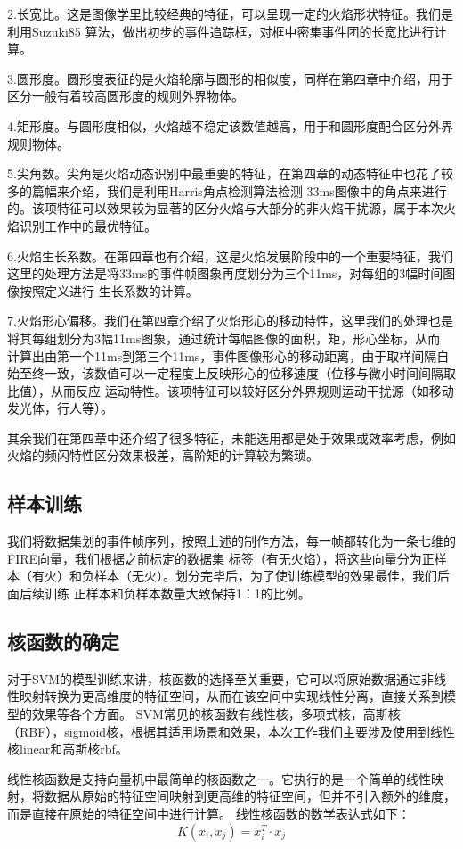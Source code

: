 2.长宽比。这是图像学里比较经典的特征，可以呈现一定的火焰形状特征。我们是利用Suzuki85 算法，做出初步的事件追踪框，对框中密集事件团的长宽比进行计算。

3.圆形度。圆形度表征的是火焰轮廓与圆形的相似度，同样在第四章中介绍，用于区分一般有着较高圆形度的规则外界物体。

4.矩形度。与圆形度相似，火焰越不稳定该数值越高，用于和圆形度配合区分外界规则物体。

5.尖角数。尖角是火焰动态识别中最重要的特征，在第四章的动态特征中也花了较多的篇幅来介绍，我们是利用Harris角点检测算法检测
33ms图像中的角点来进行的。该项特征可以效果较为显著的区分火焰与大部分的非火焰干扰源，属于本次火焰识别工作中的最优特征。

6.火焰生长系数。在第四章也有介绍，这是火焰发展阶段中的一个重要特征，我们这里的处理方法是将33ms的事件帧图象再度划分为三个11ms，对每组的3幅时间图像按照定义进行
生长系数的计算。

7.火焰形心偏移。我们在第四章介绍了火焰形心的移动特性，这里我们的处理也是将其每组划分为3幅11ms图象，通过统计每幅图像的面积，矩，形心坐标，从而
计算出由第一个11ms到第三个11ms，事件图像形心的移动距离，由于取样间隔自始至终一致，该数值可以一定程度上反映形心的位移速度（位移与微小时间间隔取比值），从而反应
运动特性。该项特征可以较好区分外界规则运动干扰源（如移动发光体，行人等）。

其余我们在第四章中还介绍了很多特征，未能选用都是处于效果或效率考虑，例如火焰的频闪特性区分效果极差，高阶矩的计算较为繁琐。
\subsection{样本训练}
我们将数据集划的事件帧序列，按照上述的制作方法，每一帧都转化为一条七维的FIRE向量，我们根据之前标定的数据集
标签（有无火焰），将这些向量分为正样本（有火）和负样本（无火）。划分完毕后，为了使训练模型的效果最佳，我们后面后续训练
正样本和负样本数量大致保持1：1的比例。
\subsection{核函数的确定}
对于SVM的模型训练来讲，核函数的选择至关重要，它可以将原始数据通过非线性映射转换为更高维度的特征空间，从而在该空间中实现线性分离，直接关系到模型的效果等各个方面。
SVM常见的核函数有线性核，多项式核，高斯核（RBF），sigmoid核，根据其适用场景和效果，本次工作我们主要涉及使用到线性核linear和高斯核rbf。

线性核函数是支持向量机中最简单的核函数之一。它执行的是一个简单的线性映射，将数据从原始的特征空间映射到更高维的特征空间，但并不引入额外的维度，而是直接在原始的特征空间中进行计算。
线性核函数的数学表达式如下：
\begin{equation} 
    K(x_i,x_j)=x_i^T·x_j
\end{equation}

